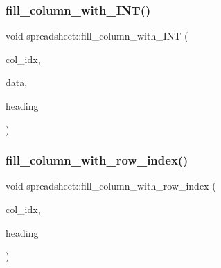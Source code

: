 \mbox{\label{classspreadsheet_aab09e262f663de456c6a1ff9fc2b977c}} 
\subsubsection{\texorpdfstring{fill\+\_\+column\+\_\+with\+\_\+\+I\+N\+T()}{fill\_column\_with\_INT()}}
{\footnotesize\ttfamily void spreadsheet\+::fill\+\_\+column\+\_\+with\+\_\+\+I\+NT (\begin{DoxyParamCaption}\item[{\mbox{\hyperlink{galois_8h_a09fddde158a3a20bd2dcadb609de11dc}{I\+NT}}}]{col\+\_\+idx,  }\item[{\mbox{\hyperlink{galois_8h_a09fddde158a3a20bd2dcadb609de11dc}{I\+NT}} $\ast$}]{data,  }\item[{const \mbox{\hyperlink{galois_8h_ab6cc7b4aeb6ea31aba2b3fbfc83ff5e6}{B\+Y\+TE}} $\ast$}]{heading }\end{DoxyParamCaption})}

\mbox{\label{classspreadsheet_a24ffe3a895380385eb9d60c1a4389157}} 
\subsubsection{\texorpdfstring{fill\+\_\+column\+\_\+with\+\_\+row\+\_\+index()}{fill\_column\_with\_row\_index()}}
{\footnotesize\ttfamily void spreadsheet\+::fill\+\_\+column\+\_\+with\+\_\+row\+\_\+index (\begin{DoxyParamCaption}\item[{\mbox{\hyperlink{galois_8h_a09fddde158a3a20bd2dcadb609de11dc}{I\+NT}}}]{col\+\_\+idx,  }\item[{const \mbox{\hyperlink{galois_8h_ab6cc7b4aeb6ea31aba2b3fbfc83ff5e6}{B\+Y\+TE}} $\ast$}]{heading }\end{DoxyParamCaption})}

\mbox{\label{classspreadsheet_a7b49e3dfb10f5cdd57bacd4d21a60e3c}} 
